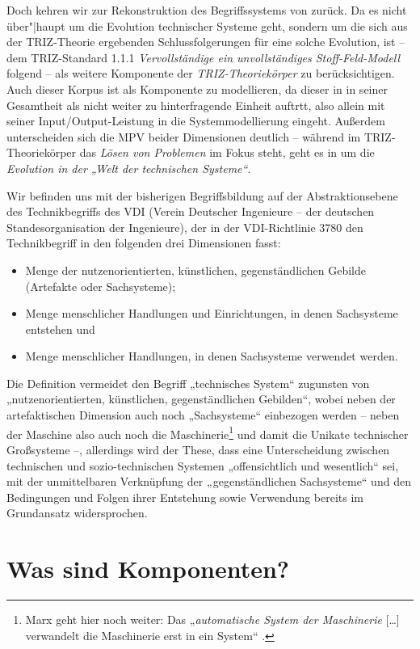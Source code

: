 \documentclass[11pt,a4paper]{article}
\begin{document}
Doch kehren wir zur Rekonstruktion des Begriffssystems von \cite{TESE2018}
zurück.  Da es nicht über"|haupt um die Evolution technischer Systeme geht,
sondern um die sich aus der TRIZ-Theorie ergebenden Schlussfolgerungen für
eine solche Evolution, ist -- dem TRIZ-Standard 1.1.1 \emph{Vervollständige
  ein unvollständiges Stoff-Feld-Modell} folgend -- als weitere Komponente der
\emph{TRIZ-Theoriekörper} zu berücksichtigen. Auch dieser Korpus ist als
Komponente zu modellieren, da dieser in \cite{TESE2018} in seiner Gesamtheit
als nicht weiter zu hinterfragende Einheit auftrtt, also allein mit seiner
Input/Output-Leistung in die Systemmodellierung eingeht.  Außerdem
unterscheiden sich die MPV beider Dimensionen deutlich -- während im
TRIZ-Theoriekörper das \emph{Lösen von Problemen} im Fokus steht, geht es in
\cite{TESE2018} um die \emph{Evolution in der „Welt der technischen Systeme“}.

Wir befinden uns mit der bisherigen Begriffsbildung auf der Abstraktionsebene
des Technikbegriffs des VDI (Verein Deutscher Ingenieure -- der deutschen
Standesorganisation der Ingenieure), der in der VDI-Richtlinie 3780 den
Technikbegriff in den folgenden drei Dimensionen fasst:
\begin{itemize}
\item Menge der nutzenorientierten, künstlichen, gegenständlichen Gebilde
  (Artefakte oder Sachsysteme);
\item Menge menschlicher Handlungen und Einrichtungen, in denen Sachsysteme
  entstehen und
\item Menge menschlicher Handlungen, in denen Sachsysteme verwendet werden.
\end{itemize}
Die Definition vermeidet den Begriff „technisches System“ zugunsten von
„nutzenorientierten, künstlichen, gegenständlichen Gebilden“, wobei neben der
artefaktischen Dimension auch noch „Sachsysteme“ einbezogen werden -- neben
der Maschine also auch noch die Maschinerie\footnote{Marx geht hier noch
  weiter: Das „\emph{automatische System der Maschinerie} [\ldots] verwandelt
  die Maschinerie erst in ein System“ \cite[S. 584]{MEW42}.} und damit die
Unikate technischer Großsysteme --, allerdings wird der These, dass eine
Unterscheidung zwischen technischen und sozio-technischen Systemen
„offensichtlich und wesentlich“ sei, mit der unmittelbaren Verknüpfung der
„gegenständlichen Sachsysteme“ und den Bedingungen und Folgen ihrer Entstehung
sowie Verwendung bereits im Grundansatz widersprochen.

\section{Was sind Komponenten?}
\end{document}
